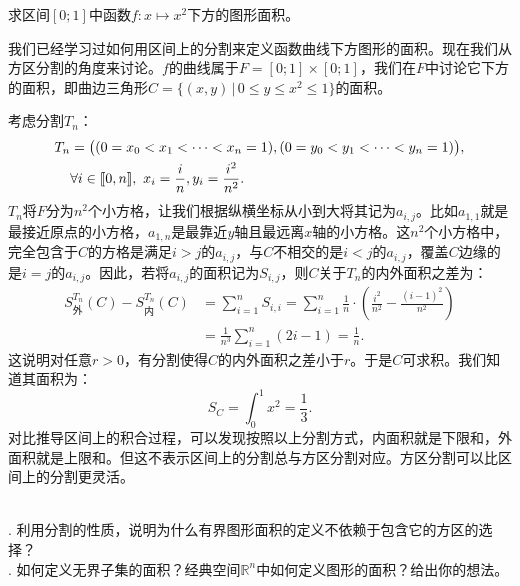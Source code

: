 \documentclass[12pt,UTF8,fontset=none]{ctexbook}
\begin{document}
\begin{et}
    求区间$[0;1]$中函数$f:x\mapsto x^2$下方的图形面积。
\end{et}
\begin{so}
    我们已经学习过如何用区间上的分割来定义函数曲线下方图形的面积。现在我们从方区分割的角度来讨论。$f$的曲线属于$F=[0;1]\times[0;1]$，我们在$F$中讨论它下方的面积，即曲边三角形$C = \{(x,y)\,|\,0\leqslant y\leqslant x^2\leqslant 1\}$的面积。

    考虑分割$T_n$：
    \begin{align*}
        T_n &= \big((0=x_0<x_1<\cdots<x_n=1),(0=y_0<y_1<\cdots<y_n=1)\big),\\
    &\forall i\in[\![0,n]\!],\,\, x_i = \frac{i}{n}, y_i = \frac{i^2}{n^2}.
    \end{align*} 
    $T_n$将$F$分为$n^2$个小方格，让我们根据纵横坐标从小到大将其记为$a_{i,j}$。比如$a_{1,1}$就是最接近原点的小方格，$a_{1,n}$是最靠近$y$轴且最远离$x$轴的小方格。这$n^2$个小方格中，完全包含于$C$的方格是满足$i>j$的$a_{i,j}$，与$C$不相交的是$i<j$的$a_{i,j}$，覆盖$C$边缘的是$i=j$的$a_{i,j}$。因此，若将$a_{i,j}$的面积记为$S_{i,j}$，则$C$关于$T_n$的内外面积之差为：
    \begin{align*}
        S_{\text{外}}^{T_n}(C) - S_{\text{内}}^{T_n}(C) &= \sum_{i=1}^n S_{i,i} = \sum_{i=1}^n \frac{1}{n}\cdot\left(\frac{i^2}{n^2} - \frac{(i-1)^2}{n^2}\right) \\
        &= \frac{1}{n^3}\sum_{i=1}^n (2i - 1) = \frac{1}{n}.
    \end{align*}
    这说明对任意$r>0$，有分割使得$C$的内外面积之差小于$r$。于是$C$可求积。我们知道其面积为：
    $$S_C = \int_{0}^1 x^2 = \frac{1}{3}.$$
    对比推导区间上的积合过程，可以发现按照以上分割方式，内面积就是下限和，外面积就是上限和。但这不表示区间上的分割总与方区分割对应。方区分割可以比区间上的分割更灵活。
\end{so}

\begin{sk}
    \mbox{} \\
    . 利用分割的性质，说明为什么有界图形面积的定义不依赖于包含它的方区的选择？\\
    . 如何定义无界子集的面积？经典空间$\mathbb{R}^n$中如何定义图形的面积？给出你的想法。
\end{sk}
\end{document}

